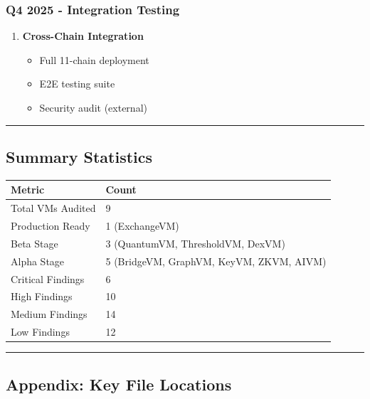 \documentclass[
]{article}
\newcounter{none} %
\providecommand{\tightlist}{%
  \setlength{\itemsep}{0pt}\setlength{\parskip}{0pt}}
\begin{document}
\subsubsection{Q4 2025 - Integration
Testing}\label{q4-2025---integration-testing}

\begin{enumerate}
\def\labelenumi{\arabic{enumi}.}
\setcounter{enumi}{8}
\tightlist
\item
  \textbf{Cross-Chain Integration}

  \begin{itemize}
  \tightlist
  \item
    Full 11-chain deployment
  \item
    E2E testing suite
  \item
    Security audit (external)
  \end{itemize}
\end{enumerate}

\begin{center}\rule{0.5\linewidth}{0.5pt}\end{center}

\subsection{Summary Statistics}\label{summary-statistics}

{\def\LTcaptype{none} %
\begin{longtable}[]{@{}ll@{}}
\toprule\noalign{}
Metric & Count \\
\midrule\noalign{}
\endhead
\bottomrule\noalign{}
\endlastfoot
Total VMs Audited & 9 \\
Production Ready & 1 (ExchangeVM) \\
Beta Stage & 3 (QuantumVM, ThresholdVM, DexVM) \\
Alpha Stage & 5 (BridgeVM, GraphVM, KeyVM, ZKVM, AIVM) \\
Critical Findings & 6 \\
High Findings & 10 \\
Medium Findings & 14 \\
Low Findings & 12 \\
\end{longtable}
}

\begin{center}\rule{0.5\linewidth}{0.5pt}\end{center}

\subsection{Appendix: Key File
Locations}\label{appendix-key-file-locations}
\end{document}

